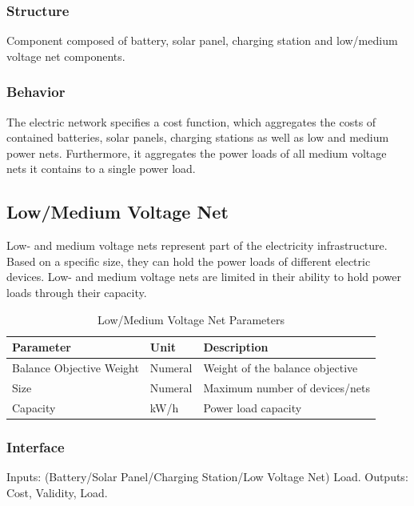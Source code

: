\subsubsection{Structure}

Component composed of battery, solar panel, charging station and low/medium voltage net components.

\subsubsection{Behavior}

The electric network specifies a cost function, which aggregates the costs of contained batteries, solar panels, charging stations as well as low and medium power nets. Furthermore, it aggregates the power loads of all medium voltage nets it contains to a single power load.

\subsection{Low/Medium Voltage Net}

Low- and medium voltage nets represent part of the electricity infrastructure. Based on a specific size, they can hold the power loads of different electric devices. Low- and medium voltage nets are limited in their ability to hold power loads through their capacity.

\begin{table}[h]
	\renewcommand{\arraystretch}{1.3}
	\caption{Low/Medium Voltage Net Parameters}
	\centering
	\begin{tabular}{lll}
		\hline
		\textbf{Parameter}                    & \textbf{Unit} & \textbf{Description} \\ \hline
		Balance Objective Weight       & Numeral    & Weight of the balance objective  \\  
		Size                  	  & Numeral    & Maximum number of devices/nets      \\
		Capacity          & kW/h    & Power load capacity      \\ \hline
	\end{tabular}
\end{table}

\subsubsection{Interface}

Inputs: (Battery/Solar Panel/Charging Station/Low Voltage Net) Load. Outputs: Cost, Validity, Load.

